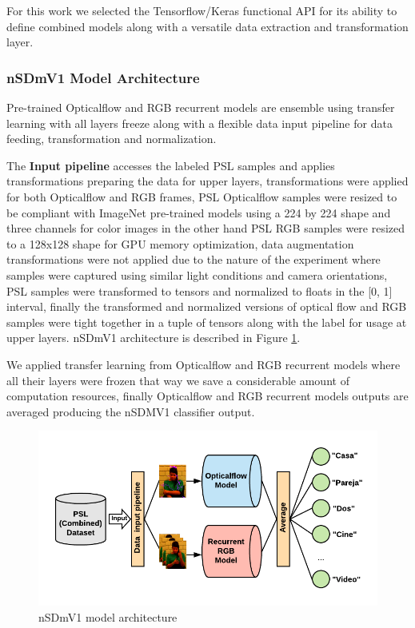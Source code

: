 \documentclass[twocolumn,conference]{article}
\begin{document}
For this work we selected the Tensorflow/Keras functional API for its ability to define combined models along with a versatile data extraction and transformation layer.

\subsubsection{nSDmV1 Model Architecture}\label{nsdmv1-architecture}
Pre-trained Opticalflow and RGB recurrent models are ensemble using transfer learning with all layers freeze along with a flexible data input pipeline for data feeding, transformation and normalization.

The \textbf{Input pipeline} accesses the labeled PSL samples and applies transformations preparing the data for upper layers, transformations were applied for both Opticalflow and RGB frames, PSL Opticalflow samples were resized to be compliant with ImageNet pre-trained models using a 224 by 224 shape and three channels for color images in the other hand PSL RGB samples were resized to a 128x128 shape for GPU memory optimization, data augmentation transformations were not applied due to the nature of the experiment where samples were captured using similar light conditions and camera orientations, PSL samples were transformed to tensors and normalized to floats in the [0, 1] interval, finally the transformed and normalized versions of optical flow and RGB samples were tight together in a tuple of tensors along with the label for usage at upper layers. nSDmV1 architecture is described in Figure \ref{fig:ndsm-v1-architecture}.

We applied transfer learning from Opticalflow and RGB recurrent models where all their layers were frozen that way we save a considerable amount of computation resources, finally Opticalflow and RGB recurrent models outputs are averaged producing the nSDMV1 classifier output.

\begin{figure}[hbt!]
\centering
\includegraphics[scale=1.0]{images/nsdm-model-architecture.png}
\caption{nSDmV1 model architecture}
\label{fig:ndsm-v1-architecture}
\end{figure}
\end{document}
